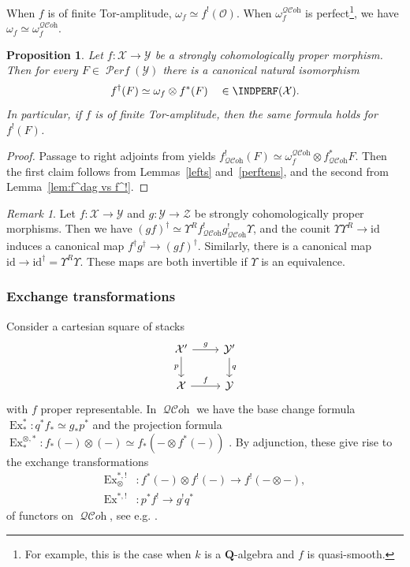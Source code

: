 \documentclass[12pt, oneside]{amsart}
\numberwithin{equation}{section}
\newtheorem{proposition}[subsubsection]{Proposition}
\theoremstyle{remark}
\newtheorem{remark}[subsubsection]{Remark}
\theoremstyle{plain}
\DeclareMathOperator{\QCOH}{\mathcal{QC}\textit{oh}}
\DeclareMathOperator{\PERF}{\mathcal{P}\textit{erf}}
\newcommand{\OO}{\mathcal{O}}
\newcommand{\YY}{\mathcal{Y}}
\newcommand{\ZZ}{\mathcal{Z}}
\newcommand{\XX}{\mathcal{X}}
\newcommand{\bQ}{\mathbf{Q}}
\newcommand{\Ren}{\Upsilon}
\newcommand{\id}{\mathrm{id}}
\begin{document}
When $f$ is of finite Tor-amplitude, $\omega_f \simeq f^!(\OO)$.
When $\omega_f^{\QCOH}$ is perfect\footnote{%
For example, this is the case when $k$ is a $\bQ$-algebra and $f$ is quasi-smooth.
}, we have $\omega_f \simeq \omega_f^{\QCOH}$.

\begin{proposition}\label{prop:f^! formula indperf}
	Let $f : \XX \to \YY$ be a strongly cohomologically proper morphism.
	Then for every $F \in \PERF(\YY)$ there is a canonical natural isomorphism
	\[
    f^\dag(F) \simeq \omega_f \otimes f^*(F) \quad \in \INDPERF(\XX).
	\]
	In particular, if $f$ is of finite Tor-amplitude, then the same formula holds for $f^!(F)$.
\end{proposition}
\begin{proof}
  Passage to right adjoints from \cite[Cor.~6.3.4.3(2)]{SAG} yields $f^!_{\QCOH}(F) \simeq \omega_f^{\QCOH} \otimes f^*_{\QCOH}F$.
  Then the first claim follows from Lemmas~\ref{lefts} and~\ref{perftens}, and the second from Lemma~\ref{lem:f^dag vs f^!}.
\end{proof}

\begin{remark}\label{rem:f^dag lax functoriality}
	Let $f : \XX \to \YY$ and $g : \YY \to \ZZ$ be strongly cohomologically proper morphisms.
	Then we have $(gf)^\dag \simeq \Ren^R f^!_{\QCOH} g^!_{\QCOH} \Ren$, and the counit $\Ren\Ren^R \to \id$ induces a canonical map $f^\dag g^\dag \to (gf)^\dag$.
  Similarly, there is a canonical map $\id \to \id^\dag = \Ren^R\Ren$.
  These maps are both invertible if $\Ren$ is an equivalence.
\end{remark}

\subsubsection{Exchange transformations}\label{sssec:Ex f^* f^dag indperf}

Consider a cartesian square of stacks
\[\begin{tikzcd}
  \XX' \ar{r}{g}\ar[swap]{d}{p} & \YY' \ar{d}{q} \\
  \XX \ar{r}{f} & \YY
\end{tikzcd}\]
with $f$ proper representable.
In $\QCOH$ we have the base change formula $\operatorname{Ex}^*_* : q^*f_* \simeq g_*p^*$ \cite[Prop.~6.3.4.1(b)]{SAG} and the projection formula $\operatorname{Ex}^{\otimes,*}_* : f_*(-) \otimes (-) \simeq f_*(- \otimes f^*(-))$ \cite[Cor.~6.3.4.3(2)]{SAG}.
By adjunction, these give rise to the exchange transformations
\begin{align*}
  \operatorname{Ex}^{*,!}_\otimes &: f^*(-) \otimes f^!(-) \to f^!(- \otimes -),\\
  \operatorname{Ex}^{*,!} &: p^*f^! \to g^!q^*
\end{align*}
of functors on $\QCOH$, see e.g. \cite[A.1.2, A.2.7]{weavelisse}.
\end{document}
